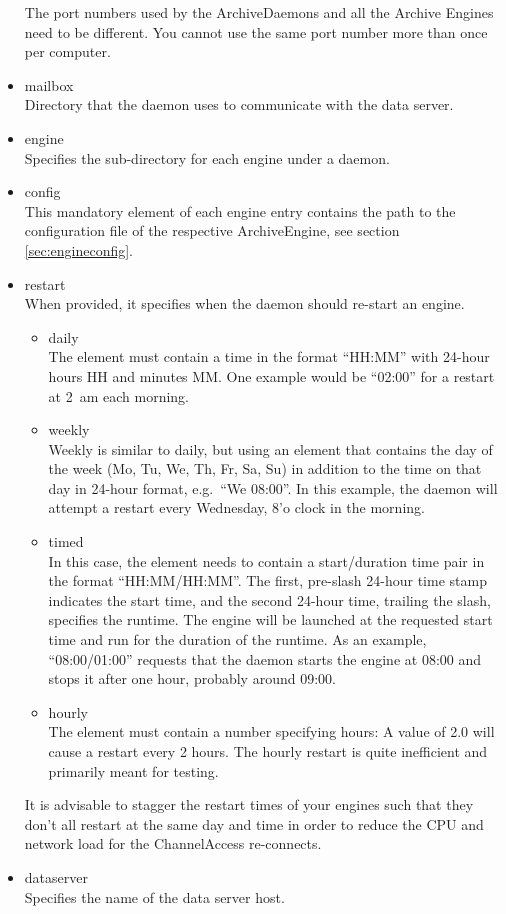 \begin{itemize}
      \NOTE The port numbers used by the ArchiveDaemons and all the Archive
      Engines need to be different. You cannot use the same port number more
      than once per computer.
\item mailbox\\
      Directory that the daemon uses to communicate with the data server.
\item engine\\
      Specifies the sub-directory for each engine under a daemon.
\item config\\
      This mandatory element of each engine entry contains the path to the
      configuration file of the respective ArchiveEngine, see section
      \ref{sec:engineconfig}.
\item restart\\
      When provided, it specifies when the daemon should re-start an engine.
      \begin{itemize}
      \item daily\\
         The element must contain a time in the
	 format ``HH:MM'' with 24-hour hours HH and minutes MM. One example
	 would be ``02:00'' for a restart at 2~am each morning.
      \item weekly\\
	 Weekly is similar to daily, but using an element that contains the day
	 of the week (Mo, Tu,  We, Th, Fr, Sa, Su) in addition to the time
	 on that day in 24-hour format, e.g.\ ``We 08:00''. In this example,
	 the daemon will attempt a restart every Wednesday,
         8'o clock in the morning.
      \item timed\\
	 In this case, the element needs to contain a start/duration time pair
	 in the format ``HH:MM/HH:MM''. The first, pre-slash 24-hour time stamp
	 indicates the start time, and the second 24-hour time, trailing the
	 slash, specifies the runtime. The engine will be launched at the
	 requested start time and run for the duration of the runtime. As an
	 example, ``08:00/01:00'' requests that the daemon starts the engine at
	 08:00 and stops it after one hour, probably around 09:00.
      \item hourly\\
         The element must contain a number specifying hours: A value
	 of 2.0 will cause a restart every 2 hours. The hourly restart
	 is quite inefficient and primarily meant for testing.
      \end{itemize}
      \NOTE It is advisable to stagger the restart times of your engines
      such that they don't all restart at the same day and time in order to
      reduce the CPU and network load for the ChannelAccess re-connects.
\item dataserver\\
      Specifies the name of the data server host.
\end{itemize}

